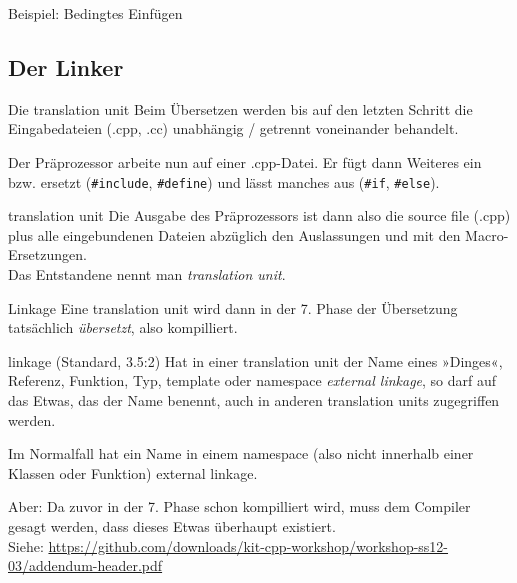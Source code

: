 \begin{frame}{Beispiel: Bedingtes Einfügen}
	\footnotesize
	
\end{frame}




\subsection{Der Linker}

\begin{frame}[fragile]{Die translation unit}
	Beim Übersetzen werden bis auf den letzten Schritt die Eingabedateien (.cpp, .cc) unabhängig / getrennt voneinander behandelt.
	
	Der Präprozessor arbeite nun auf einer .cpp-Datei. Er fügt dann Weiteres ein bzw. ersetzt (\verb|#include|, \verb|#define|) und lässt manches aus (\verb|#if|, \verb|#else|).
	
	\vspace{1em}
	
	\begin{block}{translation unit}
		Die Ausgabe des Präprozessors ist dann also die source file (.cpp) plus alle eingebundenen Dateien abzüglich den Auslassungen und mit den Macro-Ersetzungen.\\
		Das Entstandene nennt man \emph{translation unit}.
	\end{block}
\end{frame}

\begin{frame}{Linkage}
	Eine translation unit wird dann in der 7. Phase der Übersetzung tatsächlich \emph{übersetzt}, also kompilliert.
	
	\vspace{1em}
	
	\begin{block}{linkage (Standard, 3.5:2)}
		Hat in einer translation unit der Name eines »Dinges«, Referenz, Funktion, Typ, template oder namespace \emph{external linkage}, so darf auf das Etwas, das der Name benennt, auch in anderen translation units zugegriffen werden.
	\end{block}
	Im Normalfall hat ein Name in einem namespace (also nicht innerhalb einer Klassen oder Funktion) external linkage.
	
	\vspace{1em}
	\pause
	
	Aber: Da zuvor in der 7. Phase schon kompilliert wird, muss dem Compiler gesagt werden, dass dieses Etwas überhaupt existiert.\\
	\tiny
	Siehe: \url{https://github.com/downloads/kit-cpp-workshop/workshop-ss12-03/addendum-header.pdf}
\end{frame}

